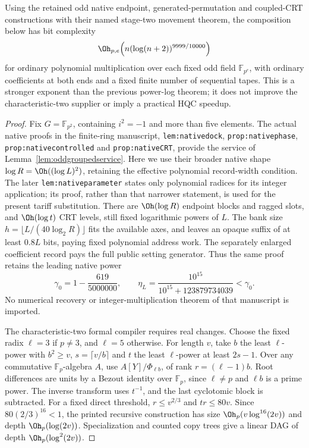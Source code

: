 \begin{proposition}
\label{prop:oddcyclotomichost}
Using the retained odd native endpoint, generated-permutation and
coupled-CRT constructions with their named stage-two movement theorem,
the composition below has bit complexity
\[
 \Oh_{p,e}\!\left(n(\log(n+2))^{9999/10000}\right)
\]
for ordinary polynomial multiplication over each fixed odd field
$\mathbb F_{p^e}$, with ordinary coefficients at both ends and a fixed
finite number of sequential tapes. This is a stronger exponent
than the previous power-log theorem; it does not improve the
characteristic-two supplier or imply a practical HQC speedup.
\end{proposition}
\begin{proof}
Fix $G=\mathbb F_{p^2}$, containing $i^2=-1$ and more than five
elements. The actual native proofs in the finite-ring manuscript,
\texttt{lem:nativedock}, \texttt{prop:nativephase},
\texttt{prop:nativecontrolled} and \texttt{prop:nativeCRT}, provide
the service of Lemma~\ref{lem:oddgroupedservice}. Here we use their
broader native shape $\log R=\Oh((\log L)^2)$, retaining the
effective polynomial record-width condition. The later
\texttt{lem:nativeparameter} states only polynomial radices for its
integer application; its proof, rather than that narrower statement,
is used for the present tariff substitution. There are
$\Oh(\log R)$ endpoint blocks and ragged slots, and
$\Oh(\log t)$ CRT levels, still fixed logarithmic powers of $L$.
The bank size $h=\lfloor L/(40\log_2R)\rfloor$ fits the available
axes, and leaves an opaque suffix of at least $0.8L$ bits, paying
fixed polynomial address work. The separately enlarged coefficient
record pays the full public setting generator. Thus the same proof
retains the leading native power
\[
 \gamma_0=1-\frac{619}{5000000},\qquad
 \eta_L=\frac{10^{15}}{10^{15}+123879734039}<\gamma_0.
\]
No numerical recovery or integer-multiplication theorem of that
manuscript is imported.

The characteristic-two formal compiler requires real changes.
Choose the fixed radix $\ell=3$ if $p\ne3$, and $\ell=5$ otherwise.
For length $v$, take $b$ the least $\ell$-power with $b^2\ge v$,
$s=\lceil v/b\rceil$ and $t$ the least $\ell$-power at least
$2s-1$. Over any commutative $\mathbb F_p$-algebra $A$, use
$A[Y]/\Phi_{\ell b}$, of rank $r=(\ell-1)b$. Root differences
are units by a Bezout identity over $\mathbb F_p$, since
$\ell\ne p$ and $\ell b$ is a prime power. The inverse transform
uses $t^{-1}$, and the last cyclotomic block is subtracted.
For a fixed direct threshold, $r\le v^{2/3}$ and $tr\le80v$.
Since $80(2/3)^{16}<1$, the printed recursive construction has
size $\Oh_p(v\log^{16}(2v))$ and depth $\Oh_p(\log(2v))$.
Specialization and counted copy trees give a linear DAG of depth
$\Oh_p(\log^2(2v))$.


\end{proof}
